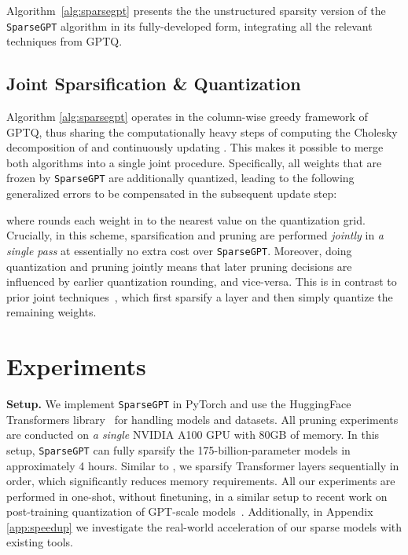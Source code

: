\documentclass{article}
\theoremstyle{plain}
\theoremstyle{definition}
\theoremstyle{remark}
\renewcommand{\paragraph}[1]{\vspace{-0.1em} \noindent \textbf{#1}}
\newcommand{\sparsegpt}[1]{\texttt{SparseGPT}}
\begin{document}
Algorithm~\ref{alg:sparsegpt} presents the the unstructured sparsity version of the \sparsegpt{} algorithm in its fully-developed form, integrating all the relevant techniques from GPTQ. 

\subsection{Joint Sparsification \& Quantization}
\label{sec:joint}

Algorithm \ref{alg:sparsegpt} operates in the column-wise greedy framework of GPTQ, thus sharing the computationally heavy steps of computing the Cholesky decomposition of  and continuously updating . This makes it possible to merge both algorithms into a single joint procedure. Specifically, all weights that are frozen by \sparsegpt{} are additionally quantized, leading to the following generalized errors to be compensated in the subsequent update step:

where  rounds each weight in  to the nearest value on the quantization grid. Crucially, in this scheme, sparsification and pruning are performed \textit{jointly} in \textit{a single pass} at essentially no extra cost over \sparsegpt{}. Moreover,  doing quantization and pruning jointly means that later pruning decisions are influenced by earlier quantization rounding, and vice-versa. This is in contrast to prior joint techniques~\cite{frantar2022obc}, which first sparsify a layer and then simply quantize the remaining weights.

\section{Experiments}
\label{sec:experiments}

\paragraph{Setup.} We implement \sparsegpt{} in PyTorch \cite{paszke2019pytorch} and use the HuggingFace Transformers library~\cite{wolf2019huggingface} for handling models and datasets. All pruning experiments are conducted on \emph{a single} NVIDIA A100 GPU with 80GB of memory. In this setup, \sparsegpt{} can fully sparsify the 175-billion-parameter models in approximately 4 hours.  Similar to \citet{yao2022zeroquant, frantar2022gptq}, we sparsify Transformer layers sequentially in order, which significantly reduces memory requirements. All our experiments are performed in one-shot, without finetuning, in a similar setup to recent work on post-training quantization of GPT-scale models~\cite{frantar2022gptq, yao2022zeroquant, dettmers2022llm}. Additionally, in Appendix \ref{app:speedup} we investigate the real-world acceleration of our sparse models with existing tools.
\end{document}
